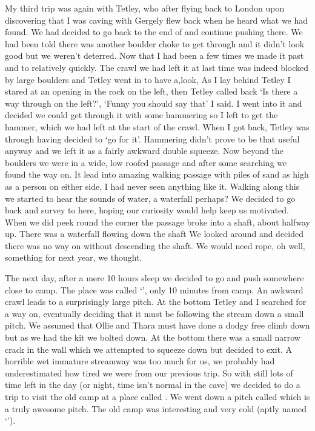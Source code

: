 My third trip was again with Tetley, who after flying back to London upon discovering that I was caving with Gergely flew back when he heard what we had found. We had decided to go back to the end of  and continue pushing there. We had been told there was another boulder choke to get through and it didn’t look good but we weren’t deterred. Now that I had been a few times we made it past  and to  relatively quickly. The crawl we had left it at last time was indeed blocked by large boulders and Tetley went in to have a,look, As I lay behind Tetley I stared at an opening in the rock on the left, then Tetley called back ‘Is there a way through on the left?’, ‘Funny you should say that’ I said. I went into it and decided we could get through it with some hammering so I left to get the hammer, which we had left at the start of the crawl. When I got back, Tetley was through having decided to ‘go for it’. Hammering didn’t prove to be that useful anyway and we left it as a fairly awkward double squeeze. Now beyond the boulders we were in a wide, low roofed passage and after some searching we found the way on. It lead into amazing walking passage with piles of sand as high as a person on either side, I had never seen anything like it. Walking along this we started to hear the sounds of water, a waterfall perhaps? We decided to go back and survey to here, hoping our curiosity would help keep us motivated. When we did peek round the corner the passage broke into a shaft, about halfway up. There was a waterfall flowing down the shaft We looked around and decided there was no way on without descending the shaft. We would need rope, oh well, something for next year, we thought.

The next day, after a mere 10 hours sleep we decided to go and push somewhere close to camp. The place was called ‘’, only 10 minutes from camp. An awkward crawl leads to a surprisingly large pitch. At the bottom Tetley and I searched for a way on, eventually deciding that it must be following the stream down a small pitch. We assumed that Ollie and Thara must have done a dodgy free climb down but as we had the kit we bolted down. At the bottom there was a small narrow crack in the wall which we attempted to squeeze down but decided to exit. A horrible wet immature streamway was too much for us, we probably had underestimated how tired we were from our previous trip. So with still lots of time left in the day (or night, time isn’t normal in the cave) we decided to do a trip to visit the old camp at a place called . We went down a pitch called  which is a truly awesome pitch. The old camp was interesting and very cold (aptly named ‘’).

